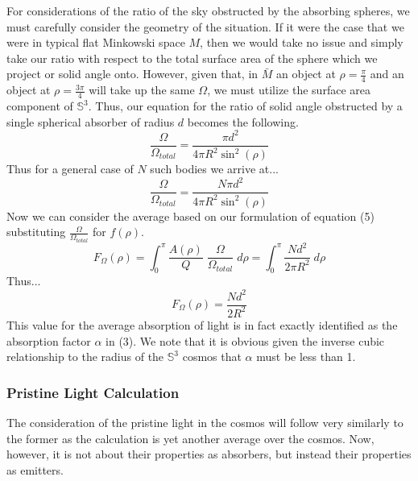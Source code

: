 \documentclass[a4paper]{article}
\begin{document}
    For considerations of the ratio of the sky obstructed by the absorbing
    spheres, we must carefully consider the geometry of the situation. If it
    were the case that we were in typical flat Minkowski space $M$, then we
    would take no issue and simply take our ratio with respect to the total
    surface area of the sphere which we project or solid angle onto. However,
    given that, in $\bar{M}$ an object at $\rho=\frac{\pi}{4}$ and an object at
    $\rho=\frac{3\pi}{4}$ will take up the same $\Omega$, we must utilize the
    surface area component of $\mathbb{S}^3$. Thus, our equation for the ratio
    of solid angle obstructed by a single spherical absorber of radius $d$
    becomes the following.
    \begin{equation*}
        \frac{\Omega}{\Omega_{total}} = \frac{\pi d^2}{4 \pi R^2 \sin^2(\rho)} 
    \end{equation*}
    Thus for a general case of $N$ such bodies we arrive at...
    \begin{equation*}
        \frac{\Omega}{\Omega_{total}} = \frac{N \pi d^2}{4 \pi R^2 \sin^2(\rho)} 
    \end{equation*}
    Now we can consider the average based on our formulation of equation (5)
    substituting $\frac{\Omega}{\Omega_{total}}$ for $f(\rho)$. 
    \begin{equation*}
        F_{\Omega}(\rho) = \int_0^\pi \frac{A(\rho)}{Q} 
        \;        \frac{\Omega}{\Omega_{total}}  \;d\rho 
                 = \int_0^\pi \frac{N d^2}{2 \pi R^2} \;d\rho
    \end{equation*}
    Thus...
    \begin{equation}
        F_{\Omega}(\rho)= \frac{N d^2}{2 R^2} 
    \end{equation}
    This value for the average absorption of light is in fact exactly 
    identified as the absorption factor $\alpha$ in (3). We note that it is
    obvious given the inverse cubic relationship to the radius of the
    $\mathbb{S}^3$ cosmos that $\alpha$ must be less than 1.


    \subsubsection{Pristine Light Calculation}
    The consideration of the pristine light in the cosmos will follow very
    similarly to the former as the calculation is yet another average over the
    cosmos. Now, however, it is not about their properties as absorbers, but
    instead their properties as emitters. 
\end{document}
